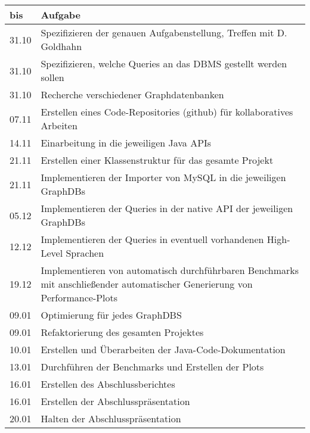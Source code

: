 \documentclass[11pt, a4paper, ngerman, oneside]{article} %
\begin{document}
\begin{table}[ht]
\begin{tabular}{|p{1cm}|p{12cm}|}
\hline \textbf{bis} & \textbf{ Aufgabe} \\ 
\hline 31.10 & Spezifizieren der genauen Aufgabenstellung, Treffen mit D. Goldhahn \\ 
\hline 31.10 & Spezifizieren, welche Queries an das DBMS gestellt werden sollen \\ 
\hline 31.10 & Recherche verschiedener Graphdatenbanken \\ 
\hline 07.11 & Erstellen eines Code-Repositories (github) für kollaboratives Arbeiten \\ 
\hline 14.11 & Einarbeitung in die jeweiligen Java APIs \\ 
\hline 21.11 & Erstellen einer Klassenstruktur für das gesamte Projekt \\ 
\hline 21.11 & Implementieren der Importer von MySQL in die jeweiligen GraphDBs  \\ 
\hline 05.12 & Implementieren der Queries in der native API der jeweiligen GraphDBs \\ 
\hline 12.12 & Implementieren der Queries in eventuell vorhandenen High-Level Sprachen \\ 
\hline 19.12 & Implementieren von automatisch durchführbaren Benchmarks mit anschließender automatischer Generierung von Performance-Plots \\ 
\hline 09.01 & Optimierung für jedes GraphDBS \\ 
\hline 09.01 & Refaktorierung des gesamten Projektes \\ 
\hline 10.01 & Erstellen und Überarbeiten der Java-Code-Dokumentation  \\ 
\hline 13.01 & Durchführen der Benchmarks und Erstellen der Plots \\ 
\hline 16.01 & Erstellen des Abschlussberichtes \\ 
\hline 16.01 & Erstellen der Abschlusspräsentation \\ 
\hline 20.01 & Halten der Abschlusspräsentation \\ 
\hline
\end{tabular}
\end{table}
\end{document}
